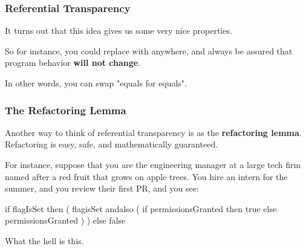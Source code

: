 \documentclass[aspectratio=169]{beamer}
\begin{document}
\begin{frame}[fragile]
  \frametitle{Referential Transparency}

  \ptmt

  It turns out that this idea gives us some very nice properties.

  \pause
  \vspace{\fill}


  \pause
  \vspace{\fill}

  So for instance, you could replace  with  anywhere, and always
  be assured that program behavior \textbf{will not change}.

  \pause
  \vspace{5pt}

  In other words, you can swap "equals for equals".

  \pause
  \vspace{\fill}

\end{frame}

\begin{frame}[fragile]
  \frametitle{The Refactoring Lemma}

  Another way to think of referential transparency is as the
  \textbf{refactoring lemma}. Refactoring is easy, safe, and
  mathematically guaranteed.

  \pause
  \vspace{\fill}

  For instance, suppose that you are the engineering manager at a large
  tech firm named after a red fruit that grows on apple trees. You
  hire an intern for the summer, and you review their first PR, and you
  see:

  \pause
  \begin{codeblock}
    if flagIsSet then (
      flagisSet andalso (
        if permissionsGranted then
          true
        else
          permissionsGranted
      )
    ) else false
  \end{codeblock}

  \pause
  \vspace{\fill}

  What the hell is this.
\end{frame}
\end{document}
